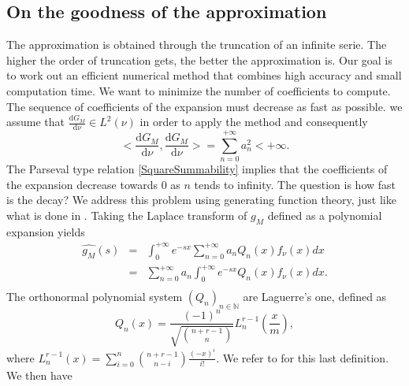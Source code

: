 \subsection{On the goodness of the approximation}
The approximation is obtained through the truncation of an infinite serie. The higher the order of truncation gets, the better the approximation is. Our goal is to work out an efficient numerical method that combines high accuracy and small computation time. We want to minimize the number of coefficients to compute. The sequence of coefficients of the expansion must decrease as fast as possible. we assume that $\frac{\text{d}G_{M}}{\text{d}\nu}\in L^{2}(\nu)$ in order to apply the method and consequently
\begin{equation}\label{SquareSummability}
<\frac{\text{d}G_{M}}{\text{d}\nu},\frac{\text{d}G_{M}}{\text{d}\nu}>=\sum^{+\infty}_{n=0}a_{n}^{2}<+\infty.
\end{equation}  
The Parseval type relation \eqref{SquareSummability} implies that the coefficients of the expansion decrease towards $0$ as $n$ tends to infinity. The question is how fast is the decay? We address this problem using generating function theory, just like what is done in \citet{AbChWh95}. Taking the Laplace transform of $g_{M}$ defined as a polynomial expansion yields
\begin{eqnarray*}
\widehat{g_{M}}(s)&=&\int_{0}^{+\infty}e^{-sx}\sum_{n=0}^{+\infty}a_{n}Q_{n}(x)f_{\nu}(x)dx \nonumber\\
&=&\sum_{n=0}^{+\infty}a_{n}\int_{0}^{+\infty}e^{-sx}Q_{n}(x)f_{\nu}(x)dx.\nonumber\\
\end{eqnarray*}
The orthonormal polynomial system $(Q_{n})_{n\in\mathbb{N}}$ are Laguerre's one, defined as
\begin{equation}\label{GammaOrthonormalPolynomial}
Q_{n}(x)=\frac{(-1)^{n}}{\sqrt{\binom{n+r-1}{n}}}L^{r-1}_{n}\left(\frac{x}{m}\right),
\end{equation}
where $L^{r-1}_{n}(x)=\sum_{i=0}^{n}\binom{n+r-1}{n-i}\frac{(-x)^{i}}{i!}$. We refer to \citet{Sz39} for this last definition. We then have
